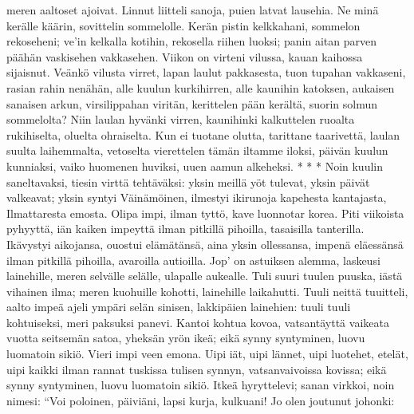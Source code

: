     meren aaltoset ajoivat.
    Linnut liitteli sanoja,
    puien latvat lausehia.
    Ne minä kerälle käärin,
    sovittelin sommelolle.
    Kerän pistin kelkkahani,
    sommelon rekoseheni;
    ve'in kelkalla kotihin,
    rekosella riihen luoksi;
    panin aitan parven päähän
    vaskisehen vakkasehen.
    Viikon on virteni vilussa,
    kauan kaihossa sijaisnut.
  \endverse
  \beginverse
    Veänkö vilusta virret,
    lapan laulut pakkasesta,
    tuon tupahan vakkaseni,
    rasian rahin nenähän,
    alle kuulun kurkihirren,
    alle kaunihin katoksen,
    aukaisen sanaisen arkun,
    virsilippahan viritän,
    kerittelen pään kerältä,
    suorin solmun sommelolta?
  \endverse
  \beginverse
    Niin laulan hyvänki virren,
    kaunihinki kalkuttelen
    ruoalta rukihiselta,
    oluelta ohraiselta.
    Kun ei tuotane olutta,
    tarittane taarivettä,
    laulan suulta laihemmalta,
    vetoselta vierettelen
    tämän iltamme iloksi,
    päivän kuulun kunniaksi,
    vaiko huomenen huviksi,
    uuen aamun alkeheksi.
    * * *
  \endverse
  \beginverse
    Noin kuulin saneltavaksi,
    tiesin virttä tehtäväksi:
    yksin meillä yöt tulevat,
    yksin päivät valkeavat;
    yksin syntyi Väinämöinen,
    ilmestyi ikirunoja
    kapehesta kantajasta,
    Ilmattaresta emosta.
  \endverse
  \beginverse
    Olipa impi, ilman tyttö,
    kave luonnotar korea.
    Piti viikoista pyhyyttä,
    iän kaiken impeyttä
    ilman pitkillä pihoilla,
    tasaisilla tanterilla.
    Ikävystyi aikojansa,
    ouostui elämätänsä,
    aina yksin ollessansa,
    impenä eläessänsä
  \endverse
  \beginverse
    ilman pitkillä pihoilla,
    avaroilla autioilla.
    Jop' on astuiksen alemma,
    laskeusi lainehille,
    meren selvälle selälle,
    ulapalle aukealle.
    Tuli suuri tuulen puuska,
    iästä vihainen ilma;
    meren kuohuille kohotti,
    lainehille laikahutti.
  \endverse
  \beginverse
    Tuuli neittä tuuitteli,
    aalto impeä ajeli
    ympäri selän sinisen,
    lakkipäien lainehien:
    tuuli tuuli kohtuiseksi,
    meri paksuksi panevi.
    Kantoi kohtua kovoa,
    vatsantäyttä vaikeata
    vuotta seitsemän satoa,
    yheksän yrön ikeä;
  \endverse
  \beginverse
    eikä synny syntyminen,
    luovu luomatoin sikiö.
    Vieri impi veen emona.
    Uipi iät, uipi lännet,
    uipi luotehet, etelät,
    uipi kaikki ilman rannat
    tuskissa tulisen synnyn,
    vatsanvaivoissa kovissa;
    eikä synny syntyminen,
    luovu luomatoin sikiö.
  \endverse
  \beginverse
    Itkeä hyryttelevi;
    sanan virkkoi, noin nimesi:
    ``Voi poloinen, päiviäni,
    lapsi kurja, kulkuani!
    Jo olen joutunut johonki:
